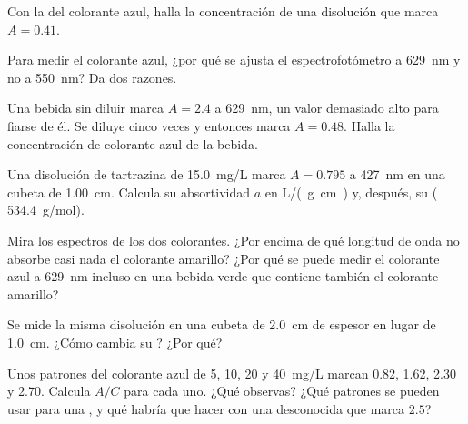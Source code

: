 \begin{exercise}[$\star\star$]\label{exo:g11:absorbance:6}
Con la  del colorante azul, halla la concentración de
una disolución que marca $A = 0.41$.
\end{exercise}

\begin{exercise}[$\star\star$]\label{exo:g11:absorbance:7}
Para medir el colorante azul, ¿por qué se ajusta el espectrofotómetro a
\qty{629}{nm} y no a \qty{550}{nm}? Da dos razones.
\end{exercise}

\begin{exercise}[$\star\star$]\label{exo:g11:absorbance:8}
Una bebida sin diluir marca $A = 2.4$ a \qty{629}{nm}, un valor
demasiado alto para fiarse de él. Se diluye cinco veces y entonces marca
$A = 0.48$. Halla la concentración de colorante azul de la bebida.
\end{exercise}

\begin{exercise}[$\star\star$]\label{exo:g11:absorbance:9}
Una disolución de tartrazina de \qty{15.0}{mg/L} marca $A = 0.795$ a
\qty{427}{nm} en una cubeta de \qty{1.00}{cm}. Calcula su absortividad
$a$ en \si{L/(g.cm)} y, después, su  ( \qty{534.4}{g/mol}).
\end{exercise}

\begin{exercise}[$\star\star$]\label{exo:g11:absorbance:10}
Mira los espectros de los dos colorantes. ¿Por encima de qué longitud de
onda no absorbe casi nada el colorante amarillo? ¿Por qué se puede medir
el colorante azul a \qty{629}{nm} incluso en una bebida verde que
contiene también el colorante amarillo?
\end{exercise}

\begin{exercise}[$\star\star$]\label{exo:g11:absorbance:11}
Se mide la misma disolución en una cubeta de \qty{2.0}{cm} de espesor en
lugar de \qty{1.0}{cm}. ¿Cómo cambia su ? ¿Por qué?
\end{exercise}

\begin{exercise}[$\star\star\star$]\label{exo:g11:absorbance:12}
Unos patrones del colorante azul de 5, 10, 20 y \qty{40}{mg/L} marcan
0.82, 1.62, 2.30 y 2.70. Calcula $A / C$ para cada uno. ¿Qué observas?
¿Qué patrones se pueden usar para una , y qué habría
que hacer con una desconocida que marca $2.5$?
\end{exercise}

